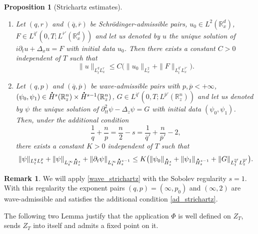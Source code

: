 \documentclass[JEP,XML,SOM,NoEqCountersInSection,NoFloatCountersInSection,Unicode,published]{cedram}
\newenvironment{enumeratei}
{\bgroup\def\theenumi{\roman{enumi}}\def\theenumii{\arabic{enumii}}\begin{enumerate}}
{\end{enumerate}\egroup}
\let\bar\oldbar
\newtheorem{proposition}[lemma]{Proposition}
\theoremstyle{definition}
\newtheorem{rmk}[lemma]{Remark}
\newcommand*{\overbigdot}[1]{%
\accentset{\mbox{\large\bfseries .}}{#1}}
\let\bar\overline
\newcommand{\R}{\mathbb{R}}
\begin{document}
\skpt
\begin{proposition}[Strichartz estimates]\label{strichartz}
\begin{enumeratei}
\item
Let $(q,r)$ and $(\bar{q},\bar{r})$ be Schrödinger-admissible pairs, $u_{0}\in L^{2}(\R_{x}^{d})$, $F\in L^{\bar{q}'}(0,T;L^{\bar{r}'}(\R_{x}^{d}))$ and let us denoted by $u$ the unique solution of $i\partial_{t}u+\Delta_{x}u=F$ with initial data $u_{0}$. Then there exists a constant $C>0$ independent of $T$ such that
\begin{equation}\label{schro_strichartz}
\|u\|_{L_{t}^{q}L_{x}^{r}}\leq C\bigl(\|u_{0}\|_{L_{x}^{2}}+\|F\|_{L_{t}^{\bar{q}'}L_{x}^{\bar{r}'}}\bigr).
\end{equation}

\item
Let $(q,p)$ and $(\bar{q},\bar{p})$ be wave-admissible pairs with $p,\bar{p}<+\infty$, $(\psi_{0},\psi_{1})\in\overbigdot{H}^{s}(\R_{z}^{n})\times\overbigdot{H}^{s-1}(\R_{z}^{n})$, $G\in L^{\bar{q}'}(0,T;L^{\bar{p}'}(\R_{z}^{n}))$ and let us denoted by $\psi$ the unique solution of $\partial_{tt}^{2}\psi-\Delta_{z}\psi=G$ with initial data $(\psi_{0},\psi_{1})$. Then, under the additional condition
\begin{equation}\label{ad_strichartz}
\frac{1}{q}+\frac{n}{p}=\frac{n}{2}-s=\frac{1}{\bar{q}'}+\frac{n}{\bar{p}'}-2,
\end{equation}
there exists a constant $K>0$ independent of $T$ such that
\begin{equation}\label{wave_strichartz}
\|\psi\|_{L_{t}^{q}L_{z}^{p}}+\|\psi\|_{L_{t}^{\infty}\overbigdot{H}_{z}^{s}}+\|\partial_{t}\psi\|_{L_{t}^{\infty}\overbigdot{H}_{z}^{s-1}}\leq K\bigl(\|\psi_{0}\|_{\overbigdot{H}_{z}^{s}}+\|\psi_{1}\|_{\overbigdot{H}_{z}^{s-1}}+\|G\|_{L_{t}^{\bar{q}'}L_{z}^{\bar{p}'}}\bigr).
\end{equation}
\end{enumeratei}
\end{proposition}

\begin{rmk}
We will apply \eqref{wave_strichartz} with the Sobolev regularity $s=1$. With this regularity the exponent pairs $(q,p)=(\infty,p_{0})$ and $(\infty,2)$ are wave-admissible and satisfies the additional condition \eqref{ad_strichartz}.
\end{rmk}

The following two Lemma justify that the application $\Phi$ is well defined on $Z_{T}$, sends $Z_{T}$ into itself and admits a fixed point on it.
\end{document}
